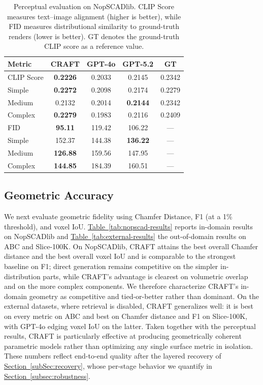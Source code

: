 \documentclass[conference]{IEEEtran}
\newcommand{\colref}[2]{\hyperref[#2]{#1~\ref*{#2}}}
\newcommand{\secref}[1]{\colref{Section}{#1}}
\newcommand{\tabref}[1]{\colref{Table}{#1}}
\begin{document}
\begin{table}[t!]
    \centering
    \caption{Perceptual evaluation on NopSCADlib. CLIP Score measures text--image alignment (higher is better), while FID measures distributional similarity to ground-truth renders (lower is better). GT denotes the ground-truth CLIP score as a reference value.}
    \label{tab:perceptual}
    \small
    \setlength{\tabcolsep}{4pt}
    \begin{tabular}{lcccc}
    \toprule
    Metric & CRAFT & GPT-4o & GPT-5.2 & GT \\
    \midrule
    CLIP Score & \textbf{0.2226} & 0.2033 & 0.2145 & 0.2342 \\
    \quad Simple & \textbf{0.2272} & 0.2098 & 0.2174 & 0.2279 \\
    \quad Medium & 0.2132 & 0.2014 & \textbf{0.2144} & 0.2342 \\
    \quad Complex & \textbf{0.2279} & 0.1983 & 0.2116 & 0.2409 \\
    \midrule
    FID & \textbf{95.11} & 119.42 & 106.22 & --- \\
    \quad Simple & 152.37 & 144.38 & \textbf{136.22} & --- \\
    \quad Medium & \textbf{126.88} & 159.56 & 147.95 & --- \\
    \quad Complex & \textbf{144.85} & 184.39 & 160.51 & --- \\
    \bottomrule
    \end{tabular}
\end{table}

\subsection{Geometric Accuracy}

We next evaluate geometric fidelity using Chamfer Distance, F1 (at a 1\% threshold), and voxel IoU. \tabref{tab:nopscad-results} reports in-domain results on NopSCADlib and \tabref{tab:external-results} the out-of-domain results on ABC and Slice-100K. On NopSCADlib, CRAFT attains the best overall Chamfer distance and the best overall voxel IoU and is comparable to the strongest baseline on F1; direct generation remains competitive on the simpler in-distribution parts, while CRAFT's advantage is clearest on volumetric overlap and on the more complex components. We therefore characterize CRAFT's in-domain geometry as competitive and tied-or-better rather than dominant. On the external datasets, where retrieval is disabled, CRAFT generalizes well: it is best on every metric on ABC and best on Chamfer distance and F1 on Slice-100K, with GPT-4o edging voxel IoU on the latter. Taken together with the perceptual results, CRAFT is particularly effective at producing geometrically coherent parametric models rather than optimizing any single surface metric in isolation. These numbers reflect end-to-end quality after the layered recovery of \secref{subSec:recovery}, whose per-stage behavior we quantify in \secref{subsec:robustness}.
\end{document}
